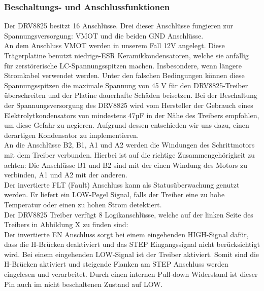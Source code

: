 \newpage

\subsubsection{Beschaltungs- und Anschlussfunktionen}
Der DRV8825 besitzt 16 Anschlüsse.
Drei dieser Anschlüsse fungieren zur Spannungsversorgung: VMOT und die beiden GND Anschlüsse. \\

An dem Anschluss VMOT werden in unserem Fall 12V angelegt.
Diese Trägerplatine benutzt niedrige-\acs{ESR} Keramikkondensatoren, welche sie anfällig für zerstörerische LC-Spannungsspitzen machen.
Insbesondere, wenn längere Stromkabel verwendet werden.
Unter den falschen Bedingungen können diese Spannungsspitzen die maximale Spannung von 45 V für den DRV8825-Treiber überschreiten und der Platine dauerhafte Schäden beisetzen.
Bei der Beschaltung der Spannungsversorgung des DRV8825 wird vom Hersteller der Gebrauch eines Elektrolytkondensators von mindestens 47µF in der Nähe des Treibers empfohlen, um diese Gefahr zu negieren.
Aufgrund dessen entschieden wir uns dazu, einen derartigen Kondensator zu implementieren.\\

An die Anschlüsse B2, B1, A1 und A2 werden die Windungen des Schrittmotors mit dem Treiber verbunden.
Hierbei ist auf die richtige Zusammengehörigkeit zu achten:
Die Anschlüsse B1 und B2 sind mit der einen Windung des Motors zu verbinden, A1 und A2 mit der anderen. \\

Der invertierte FLT (Fault)  Anschluss kann als Statusüberwachung genutzt werden.
Er liefert ein LOW-Pegel Signal, falls der Treiber eine zu hohe Temperatur oder einen zu hohen Strom detektiert. \\

Der DRV8825 Treiber verfügt 8 Logikanschlüsse, welche auf der linken Seite des Treibers in Abbildung X zu finden sind: \\

Der invertierte EN Anschluss sorgt bei einem eingehenden HIGH-Signal dafür, dass die H-Brücken deaktiviert und das STEP Eingangssignal nicht berücksichtigt wird.
Bei einem eingehenden LOW-Signal ist der Treiber aktiviert.
Somit sind die H-Brücken aktiviert und steigende Flanken am STEP Anschluss werden eingelesen und verarbeitet.
Durch einen internen Pull-down Widerstand ist dieser Pin auch im nicht beschaltenen Zustand auf LOW. \\

